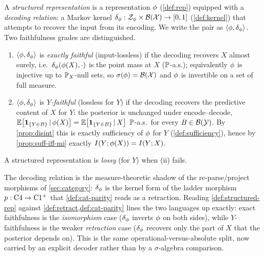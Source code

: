 \begin{definition}
\label{def:structured-rep}
A \emph{structured representation} is a representation $\phi$ (\cref{def:rep})
equipped with a \emph{decoding relation}: a Markov kernel
$\delta_{\phi} : \mathcal{Z}_{\phi}\times\mathcal{B}(\mathcal{X})\to[0,1]$ (\cref{def:kernel})
that attempts to recover the input from its encoding. We write the pair as
$\langle \phi, \delta_{\phi}\rangle$. Two faithfulness grades are distinguished.
\begin{enumerate}
  \item[(i)] $\langle \phi, \delta_{\phi}\rangle$ is \emph{exactly faithful} (input-lossless) if the
    decoding recovers $X$ almost surely, i.e.\ $\delta_{\phi}(\phi(X),\cdot)$
    is the point mass at $X$ ($\mathbb{P}$-a.s.); equivalently $\phi$ is injective
    up to $\mathbb{P}_X$-null sets, so $\sigma\!\left(\phi\right) = \mathcal{B}(\mathcal{X})$ and $\phi$ is
    invertible on a set of full measure.
  \item[(ii)] $\langle \phi, \delta_{\phi}\rangle$ is \emph{$Y$-faithful} (lossless for $Y$) if the
    decoding recovers the predictive content of $X$ for $Y$: the posterior is
    unchanged under encode--decode,
    $\mathbb{E}\!\left[\mathbf{1}_{\{Y\in B\}} \,\vert\, \phi(X)\right] =
     \mathbb{E}\!\left[\mathbf{1}_{\{Y\in B\}} \,\vert\, X\right]$ $\mathbb{P}$-a.s.\ for every
    $B\in\mathcal{B}(\mathcal{Y})$. By \cref{prop:disint} this is exactly sufficiency of
    $\phi$ for $Y$ (\cref{def:sufficiency}), hence by \cref{prop:suff-iff-mi}
    exactly $I(Y ; \phi(X))=I(Y ; X)$.
\end{enumerate}
A structured representation is \emph{lossy} (for $Y$) when (ii) fails.
\end{definition}

The decoding relation is the measure-theoretic shadow of the re-parse/project
morphisms of \cref{sec:category}: $\delta_{\phi}$ is the kernel form of the
ladder morphism $p:\mathrm{C}4\to\mathrm{C1^{+}}$ that \cref{def:cat-parity} reads
as a retraction. Reading \cref{def:structured-rep} against
\cref{def:retract,def:cat-parity} lines the two languages up exactly: exact
faithfulness is the \emph{isomorphism} case ($\delta_{\phi}$ inverts $\phi$ on
both sides), while $Y$-faithfulness is the weaker \emph{retraction} case
($\delta_{\phi}$ recovers only the part of $X$ that the posterior depends on).
This is the same operational-versus-absolute split, now carried by an explicit
decoder rather than by a $\sigma$-algebra comparison.

